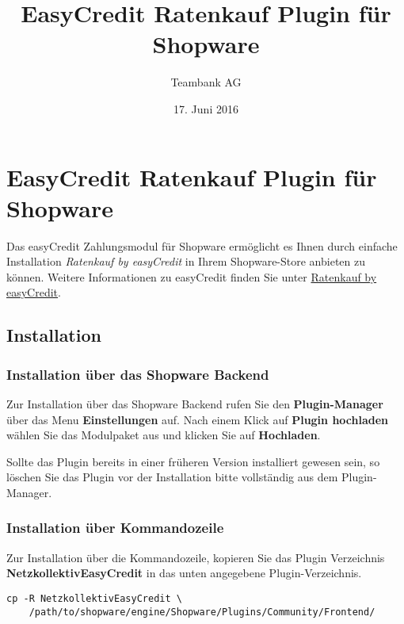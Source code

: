 \usepackage[ngerman]{babel}
\afterpage{\clearpage}
\renewcommand{\contentsname}{Inhalt}
\renewcommand{\tableofcontents}{\tableofcontents\pagebreak}

\title{EasyCredit Ratenkauf Plugin für Shopware}
\author{Teambank AG}
\date{17. Juni 2016}

\section{EasyCredit Ratenkauf Plugin für
Shopware}\label{easycredit-ratenkauf-plugin-fuxfcr-shopware}

Das easyCredit Zahlungsmodul für Shopware ermöglicht es Ihnen durch
einfache Installation \emph{Ratenkauf by easyCredit} in Ihrem
Shopware-Store anbieten zu können. Weitere Informationen zu easyCredit
finden Sie unter
\href{https://www.easycredit.de/Ratenkauf.htm}{Ratenkauf by easyCredit}.

\subsection{Installation}\label{installation}

\subsubsection{Installation über das Shopware
Backend}\label{installation-uxfcber-das-shopware-backend}

Zur Installation über das Shopware Backend rufen Sie den
\textbf{Plugin-Manager} über das Menu \textbf{Einstellungen} auf. Nach
einem Klick auf \textbf{Plugin hochladen} wählen Sie das Modulpaket aus
und klicken Sie auf \textbf{Hochladen}.

Sollte das Plugin bereits in einer früheren Version installiert gewesen
sein, so löschen Sie das Plugin vor der Installation bitte vollständig
aus dem Plugin-Manager.

\subsubsection{Installation über
Kommandozeile}\label{installation-uxfcber-kommandozeile}

Zur Installation über die Kommandozeile, kopieren Sie das Plugin
Verzeichnis \textbf{NetzkollektivEasyCredit} in das unten angegebene
Plugin-Verzeichnis.

\begin{verbatim}
cp -R NetzkollektivEasyCredit \
    /path/to/shopware/engine/Shopware/Plugins/Community/Frontend/
\end{verbatim}

